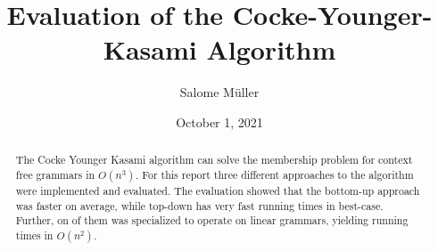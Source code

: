 \documentclass[10pt]{article}
\title{Evaluation of the Cocke-Younger-Kasami Algorithm}
\author{Salome Müller}
\date{October 1, 2021}
\begin{document}
\maketitle

\begin{abstract}
    The Cocke Younger Kasami algorithm can solve the membership problem for context free grammars in $O(n^3)$.
    For this report three different approaches to the algorithm were implemented and evaluated.
    The evaluation showed that the bottom-up approach was faster on average, while top-down has very fast running times in best-case.
    Further, on of them was specialized to operate on linear grammars, yielding running times in $O(n^2)$.
\end{abstract}

\pagebreak
\tableofcontents
\pagebreak







\pagebreak
\printbibliography
\end{document}
